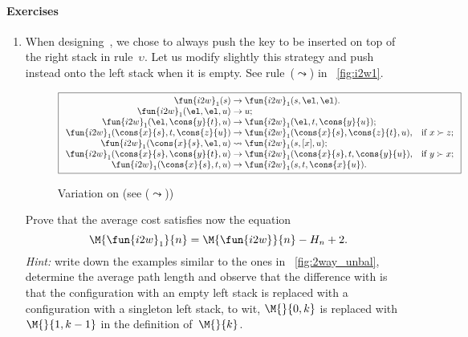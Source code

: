 \paragraph{Exercises}
\begin{enumerate}

  \item When designing~, we chose to
    always push the key to be inserted on top of the right stack in
    rule~\(\upsilon\). Let us modify slightly this strategy and push
    instead onto the left stack when it is empty. See
    rule~(\(\leadsto\)) in \fig~\vref{fig:i2w1}.
    \begin{figure}[b]
    \begin{equation*}
      \boxed{%
      \begin{array}{r@{\;}l@{\;}ll}
        \fun{i2w}_1(s) & \rightarrow
                      & \fun{i2w}_1(s,\el,\el).\\
        \fun{i2w}_1(\el,\el,u) & \rightarrow & u;\\
        \fun{i2w}_1(\el,\cons{y}{t},u)
                     & \rightarrow
                     & \fun{i2w}_1(\el,t,\cons{y}{u});\\
        \fun{i2w}_1(\cons{x}{s},t,\cons{z}{u})
                     & \rightarrow
                     & \fun{i2w}_1(\cons{x}{s},\cons{z}{t},u),
                     & \text{if \(x \succ z\)};\\
        \fun{i2w}_1(\cons{x}{s},\el,u)
                     & \leadsto
                     & \fun{i2w}_1(s,[x],u);\\
        \fun{i2w}_1(\cons{x}{s},\cons{y}{t},u)
                     & \rightarrow
                     & \fun{i2w}_1(\cons{x}{s},t,\cons{y}{u}),
                     & \text{if \(y \succ x\)};\\
        \fun{i2w}_1(\cons{x}{s},t,u)
                     & \rightarrow
                     & \fun{i2w}_1(s,t,\cons{x}{u}).
      \end{array}}
    \end{equation*}
    \caption{Variation  on  (see
      (\(\leadsto\)))}
    \label{fig:i2w1}
    \end{figure}
    Prove that the average cost satisfies now the equation
     
    \begin{equation*}
      \M{\fun{i2w}_1}{n} = \M{\fun{i2w}}{n} - H_n + 2.
    \end{equation*}
    \emph{Hint:} write down the examples similar to the ones in
    \fig~\vref{fig:2way_unbal}, determine the average path length and
    observe that the difference with
     is that the configuration with
    an empty left stack is replaced with a configuration with a
    singleton left stack, to wit, \(\M{}{0,k}\) is replaced
    with~\(\M{}{1,k-1}\) in the definition of~\(\M{}{k}\).


\end{enumerate}
